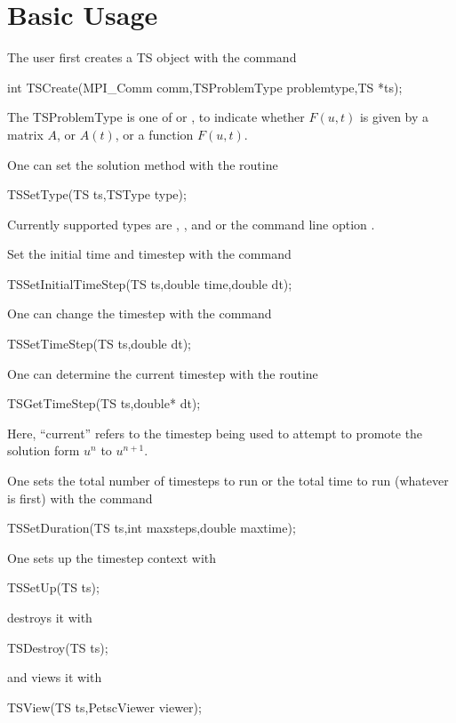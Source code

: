 \section{Basic Usage}

The user first creates a TS object with the command
\begin{tabbing}
  int TSCreate(MPI\_Comm comm,TSProblemType problemtype,TS *ts);
\end{tabbing}
 The TSProblemType 
is one of  or ,
to indicate whether $ F(u,t) $ is given by a matrix $ A $, or $ A(t) $, or a
function $ F(u,t). $

One can set the solution method with the routine
\begin{tabbing}
 TSSetType(TS ts,TSType type);
\end{tabbing}
 Currently supported types are ,
, and 
  
or the command line option
.  


Set the initial time and timestep with the command
\begin{tabbing}
 TSSetInitialTimeStep(TS ts,double time,double dt);
\end{tabbing}
One  can change the timestep with the command
\begin{tabbing}
 TSSetTimeStep(TS ts,double dt);
\end{tabbing}
One  
can  determine the current timestep with the routine
\begin{tabbing}
 TSGetTimeStep(TS ts,double* dt);
\end{tabbing}
Here, ``current'' refers to the timestep being used to attempt to
promote the solution form $ u^n $ to $ u^{n+1}. $

One sets the total number of timesteps to run or the total time to run 
(whatever is first) with the command 
\begin{tabbing}
 TSSetDuration(TS ts,int maxsteps,double maxtime);
\end{tabbing}
One sets up the timestep context with 
\begin{tabbing}
 TSSetUp(TS ts);
\end{tabbing}
destroys it with 
\begin{tabbing}
 TSDestroy(TS ts);
\end{tabbing}
and views it with 
\begin{tabbing}
 TSView(TS ts,PetscViewer viewer);
\end{tabbing}

